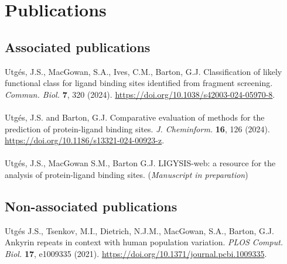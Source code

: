 \chapter*{Publications}

\section*{Associated publications}

Utgés, J.S., MacGowan, S.A., Ives, C.M., Barton, G.J. Classification of likely functional class for ligand binding sites identified from fragment screening. \textit{Commun. Biol.} \textbf{7}, 320 (2024). \url{https://doi.org/10.1038/s42003-024-05970-8}.
\\\\ 
\noindent
Utgés, J.S. and Barton, G.J. Comparative evaluation of methods for the prediction of protein-ligand binding sites. \textit{J. Cheminform.} \textbf{16}, 126 (2024). \url{https://doi.org/10.1186/s13321-024-00923-z}.
\\\\ 
\noindent
Utgés, J.S., MacGowan S.M., Barton G.J. LIGYSIS-web: a resource for the analysis of protein-ligand binding sites. (\textit{Manuscript in preparation})

\section*{Non-associated publications}

Utgés J.S., Tsenkov, M.I., Dietrich, N.J.M., MacGowan, S.A., Barton, G.J. Ankyrin repeats in context with human population variation. \textit{PLOS Comput. Biol.} \textbf{17}, e1009335 (2021). \url{https://doi.org/10.1371/journal.pcbi.1009335}.